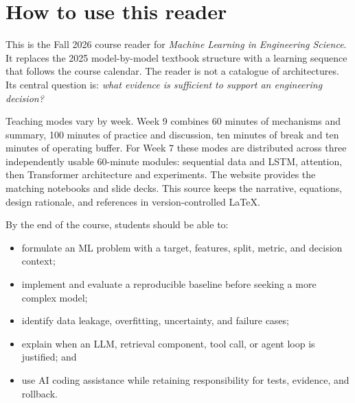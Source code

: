\chapter*{How to use this reader}

This is the Fall 2026 course reader for \emph{Machine Learning in Engineering Science}. It replaces the 2025 model-by-model textbook structure with a learning sequence that follows the course calendar. The reader is not a catalogue of architectures. Its central question is: \emph{what evidence is sufficient to support an engineering decision?}

Teaching modes vary by week. Week 9 combines 60 minutes of mechanisms and summary, 100 minutes of practice and discussion, ten minutes of break and ten minutes of operating buffer. For Week 7 these modes are distributed across three independently usable 60-minute modules: sequential data and LSTM, attention, then Transformer architecture and experiments. The website provides the matching notebooks and slide decks. This source keeps the narrative, equations, design rationale, and references in version-controlled LaTeX.

\begin{learningbox}
By the end of the course, students should be able to:
\begin{itemize}
  \item formulate an ML problem with a target, features, split, metric, and decision context;
  \item implement and evaluate a reproducible baseline before seeking a more complex model;
  \item identify data leakage, overfitting, uncertainty, and failure cases;
  \item explain when an LLM, retrieval component, tool call, or agent loop is justified; and
  \item use AI coding assistance while retaining responsibility for tests, evidence, and rollback.
\end{itemize}
\end{learningbox}

